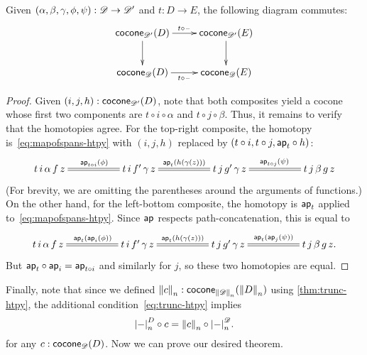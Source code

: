 \begin{lem}\label{thm:conemap-funct}
  Given $(\alpha,\beta,\gamma,\phi,\psi):\Ddiag \to \Ddiag'$ and $t:D\to E$, the following diagram commutes:
  \begin{equation*}
    \vcenter{\xymatrix{
        \cocone{\Ddiag'}{D}\ar[r]^{t \circ {\blank}}\ar[d] &
        \cocone{\Ddiag'}{E}\ar[d]\\
        \cocone{\Ddiag}{D}\ar[r]_{t \circ {\blank}} &
        \cocone{\Ddiag}{E}
      }}
  \end{equation*}
\end{lem}
\begin{proof}
  Given $(i,j,h):\cocone{\Ddiag'}{D}$, note that both composites yield a cocone whose first two components are $t\circ i\circ \alpha$ and $t\circ j\circ\beta$.
  Thus, it remains to verify that the homotopies agree.
  For the top-right composite, the homotopy is~\eqref{eq:mapofspans-htpy} with $(i,j,h)$ replaced by $(t\circ i, t\circ j, \apfunc{t}\circ h)$:
  \begin{equation*}
    \xymatrix@+2.8em{
      {t \, i \, \alpha \, f \, z} \ar@{=}[r]^{\apfunc{t\circ i}(\phi)} &
      {t \, i \, f' \, \gamma \, z} \ar@{=}[r]^{\apfunc{t}(h(\gamma(z)))} &
      {t \, j \, g' \, \gamma \, z} \ar@{=}[r]^{\apfunc{t\circ j}(\psi)} &
      {t \, j \, \beta \, g \, z}
    }
  \end{equation*}
  (For brevity, we are omitting the parentheses around the arguments of functions.)
  On the other hand, for the left-bottom composite, the homotopy is $\apfunc{t}$ applied to~\eqref{eq:mapofspans-htpy}.
  Since $\apfunc{}$ respects path-concatenation, this is equal to
  \begin{equation*}
    \xymatrix@+2.8em{
      {t \, i \, \alpha \, f \, z} \ar@{=}[r]^{\apfunc{t}(\apfunc{i}(\phi))} &
      {t \, i \, f' \, \gamma \, z} \ar@{=}[r]^{\apfunc{t}(h(\gamma(z)))} &
      {t \, j \, g' \, \gamma \, z} \ar@{=}[r]^{\apfunc{t}(\apfunc{j}(\psi))} &
      {t \, j \, \beta \, g \, z}. }
  \end{equation*}
  But $\apfunc{t}\circ \apfunc{i} = \apfunc{t\circ i}$ and similarly for $j$, so these two homotopies are equal.
\end{proof}

Finally, note that since we defined $\trunc nc : \cocone{\trunc n \Ddiag}{\trunc n D}$ using \autoref{thm:trunc-htpy}, the additional condition~\eqref{eq:trunc-htpy} implies
\begin{equation}
  \tproj[D] n- \circ c = \trunc n c \circ \tproj[\Ddiag]n- .\label{eq:conetrunc}
\end{equation}
for any $c:\cocone{\Ddiag}{D}$.
Now we can prove our desired theorem.


